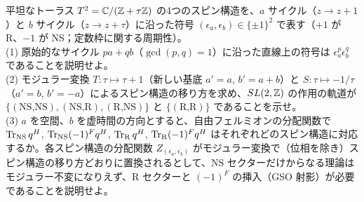 \begin{center}
\end{center}

\begin{problem}[難易度 C]\label{ch07-prob-gso}
平坦なトーラス $T^2=\mathbb{C}/(\mathbb{Z}+\tau\mathbb{Z})$ の4つのスピン構造を、$a$ サイクル（$z\to z+1$）と $b$ サイクル（$z\to z+\tau$）に沿った符号 $(\epsilon_a,\epsilon_b)\in\{\pm1\}^2$ で表す（$+1$ が R、$-1$ が NS；定数枠に関する周期性）。\\
(1) 原始的なサイクル $pa+qb$（$\gcd(p,q)=1$）に沿った直線上の符号は $\epsilon_a^p\epsilon_b^q$ であることを説明せよ。\\
(2) モジュラー変換 $T\colon\tau\mapsto\tau+1$（新しい基底 $a'=a$, $b'=a+b$）と $S\colon\tau\mapsto-1/\tau$（$a'=b$, $b'=-a$）によるスピン構造の移り方を求め、$SL(2,\mathbb{Z})$ の作用の軌道が $\{(\text{NS,NS}),(\text{NS,R}),(\text{R,NS})\}$ と $\{(\text{R,R})\}$ であることを示せ。\\
(3) $a$ を空間、$b$ を虚時間の方向とすると、自由フェルミオンの分配関数で $\Tr_{\rm NS}q^{H}$, $\Tr_{\rm NS}(-1)^Fq^{H}$, $\Tr_{\rm R}q^H$, $\Tr_{\rm R}(-1)^Fq^H$ はそれぞれどのスピン構造に対応するか。各スピン構造の分配関数 $Z_{(\epsilon_a,\epsilon_b)}$ がモジュラー変換で（位相を除き）スピン構造の移り方どおりに置換されるとして、NS セクターだけからなる理論はモジュラー不変になりえず、R セクターと $(-1)^F$ の挿入（GSO 射影）が必要であることを説明せよ。
\end{problem}

